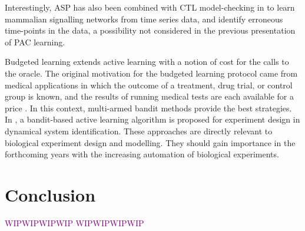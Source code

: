\documentclass{llncs}
\newcommand{\wip}[1]{\textcolor{Purple}{WIPWIPWIPWIP #1 WIPWIPWIPWIP}}
\begin{document}
Interestingly, ASP has also been combined with CTL model-checking in \cite{OPSSG16biosystems} to learn mammalian signalling networks from time series data, 
and identify erroneous time-points in the data, a possibility not considered in the previous presentation of PAC learning.


Budgeted learning extends active learning with a notion of cost for the calls to the oracle.
The original motivation for the budgeted learning protocol came from medical applications in which the outcome of a treatment,
drug trial, or control group is known, and the results of running medical tests are each available for a price \cite{DZBSM13ml}.
In this context, multi-armed bandit methods \cite{DBSSZ07icdm} provide the best strategies.
In \cite{LMALS14ecml}, a bandit-based active learning algorithm is proposed for experiment design in dynamical system identification.
These approaches are directly relevant to biological experiment design and modelling. %
They should gain importance in the forthcoming years with the increasing automation of biological experiments.





\section{Conclusion}
\wip{}



\end{document}
